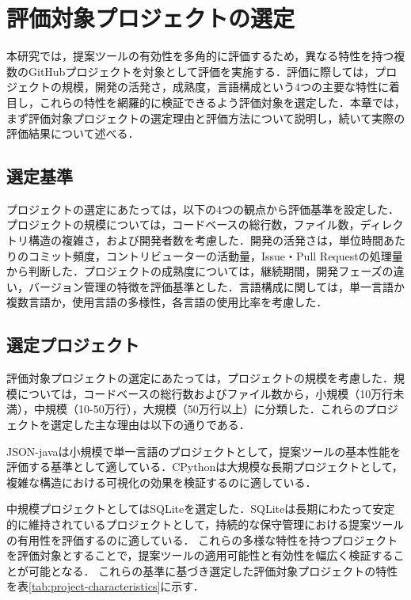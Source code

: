 \documentclass[12pt,twoside]{jbook}
\begin{document}
\section{評価対象プロジェクトの選定}
本研究では，提案ツールの有効性を多角的に評価するため，異なる特性を持つ複数のGitHubプロジェクトを対象として評価を実施する．評価に際しては，プロジェクトの規模，開発の活発さ，成熟度，言語構成という4つの主要な特性に着目し，これらの特性を網羅的に検証できるよう評価対象を選定した．本章では，まず評価対象プロジェクトの選定理由と評価方法について説明し，続いて実際の評価結果について述べる．

\subsection{選定基準}
プロジェクトの選定にあたっては，以下の4つの観点から評価基準を設定した．プロジェクトの規模については，コードベースの総行数，ファイル数，ディレクトリ構造の複雑さ，および開発者数を考慮した．開発の活発さは，単位時間あたりのコミット頻度，コントリビューターの活動量，Issue・Pull Requestの処理量から判断した．プロジェクトの成熟度については，継続期間，開発フェーズの違い，バージョン管理の特徴を評価基準とした．言語構成に関しては，単一言語か複数言語か，使用言語の多様性，各言語の使用比率を考慮した．

\subsection{選定プロジェクト}
評価対象プロジェクトの選定にあたっては，プロジェクトの規模を考慮した．規模については，コードベースの総行数およびファイル数から，小規模（10万行未満），中規模（10-50万行），大規模（50万行以上）に分類した．これらのプロジェクトを選定した主な理由は以下の通りである．

JSON-javaは小規模で単一言語のプロジェクトとして，提案ツールの基本性能を評価する基準として適している．CPythonは大規模な長期プロジェクトとして，複雑な構造における可視化の効果を検証するのに適している．

中規模プロジェクトとしてはSQLiteを選定した．SQLiteは長期にわたって安定的に維持されているプロジェクトとして，持続的な保守管理における提案ツールの有用性を評価するのに適している．
これらの多様な特性を持つプロジェクトを評価対象とすることで，提案ツールの適用可能性と有効性を幅広く検証することが可能となる．
これらの基準に基づき選定した評価対象プロジェクトの特性を表\ref{tab:project-characteristics}に示す．
\end{document}
